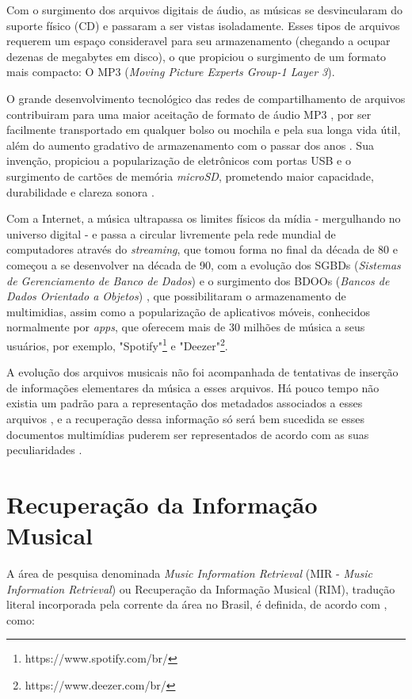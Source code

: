 Com o surgimento dos arquivos digitais de áudio, as músicas se desvincularam do suporte físico (CD) e passaram a ser vistas isoladamente. Esses tipos de arquivos requerem um espaço consideravel para seu armazenamento (chegando a ocupar dezenas de megabytes em disco), o que propiciou o surgimento de um formato mais compacto: O MP3 (\textit{Moving Picture Experts Group-1 Layer 3}).

O grande desenvolvimento tecnológico das redes de compartilhamento de arquivos contribuiram para uma maior aceitação de formato de áudio MP3 \cite{andrade&crispim2008}, por ser facilmente transportado em qualquer bolso ou mochila e pela sua longa vida útil, além do aumento gradativo de armazenamento com o passar dos anos \cite{marchi2005}. Sua invenção, propiciou a popularização de eletrônicos com portas USB e o surgimento de cartões de memória \textit{microSD}, prometendo maior capacidade, durabilidade e clareza sonora \cite{marchi2005}.

Com a Internet, a música ultrapassa os limites físicos da mídia - mergulhando no universo digital - e passa a circular livremente pela rede mundial de computadores através do \textit{streaming}, que tomou forma no final da década de 80 e começou a se desenvolver na década de 90, com a evolução dos SGBDs (\textit{Sistemas de Gerenciamento de Banco de Dados}) e o surgimento dos BDOOs (\textit{Bancos de Dados Orientado a Objetos}) \cite{junior&segundo2008}, que possibilitaram o armazenamento de multimidias, assim como a popularização de aplicativos móveis, conhecidos normalmente por \textit{apps}, que oferecem mais de 30 milhões de música a seus usuários, por exemplo, "Spotify"\footnote{https://www.spotify.com/br/} e "Deezer"\footnote{https://www.deezer.com/br/}.

A evolução dos arquivos musicais não foi acompanhada de tentativas de inserção de informações elementares da música a esses arquivos. Há pouco tempo não existia um padrão para a representação dos metadados associados a esses arquivos \cite{andrade&crispim2008}, e a recuperação dessa informação só será bem sucedida se esses documentos multimídias puderem ser representados de acordo com as suas peculiaridades \cite{gomes2015}.

\section{Recuperação da Informação Musical}

A área de pesquisa denominada \textit{Music Information Retrieval} (MIR - \textit{Music Information Retrieval}) ou Recuperação da Informação Musical (RIM), tradução literal incorporada pela corrente da área no Brasil, é definida, de acordo com , como:

